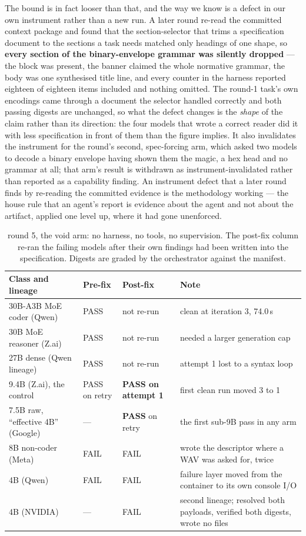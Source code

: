 \documentclass[10pt,twocolumn,letterpaper]{article}
\begin{document}
The bound is in fact looser than that, and the way we know is a defect in our own instrument rather than a new run. A later round re-read the committed context package and found that the section-selector that trims a specification document to the sections a task needs matched only headings of one shape, so \textbf{every section of the binary-envelope grammar was silently dropped} --- the block was present, the banner claimed the whole normative grammar, the body was one synthesised title line, and every counter in the harness reported eighteen of eighteen items included and nothing omitted. The round-1 task's own encodings came through a document the selector handled correctly and both passing digests are unchanged, so what the defect changes is the \emph{shape} of the claim rather than its direction: the four models that wrote a correct reader did it with less specification in front of them than the figure implies. It also invalidates the instrument for the round's second, spec-forcing arm, which asked two models to decode a binary envelope having shown them the magic, a hex head and no grammar at all; that arm's result is withdrawn as instrument-invalidated rather than reported as a capability finding. An instrument defect that a later round finds by re-reading the committed evidence is the methodology working --- the house rule that an agent's report is evidence about the agent and not about the artifact, applied one level up, where it had gone unenforced.

\begin{table}[t]\centering\footnotesize
\caption{round 5, the void arm: no harness, no tools, no supervision. The post-fix column re-ran the failing models after their own findings had been written into the specification. Digests are graded by the orchestrator against the manifest.}
\begin{tabular}{@{}L{2.7cm} l l L{4.4cm}@{}}
\toprule
Class and lineage & Pre-fix & Post-fix & Note \\
\midrule
30B-A3B MoE coder (Qwen) & PASS & not re-run & clean at iteration 3, 74.0\,s \\
30B MoE reasoner (Z.ai) & PASS & not re-run & needed a larger generation cap \\
27B dense (Qwen lineage) & PASS & not re-run & attempt 1 lost to a syntax loop \\
9.4B (Z.ai), the control & PASS on retry & \textbf{PASS on attempt 1} & first clean run moved 3 to 1 \\
7.5B raw, ``effective 4B'' (Google) & --- & \textbf{PASS} on retry & the first sub-9B pass in any arm \\
8B non-coder (Meta) & FAIL & FAIL & wrote the descriptor where a WAV was asked for, twice \\
4B (Qwen) & FAIL & FAIL & failure layer moved from the container to its own console I/O \\
4B (NVIDIA) & --- & FAIL & second lineage; resolved both payloads, verified both digests, wrote no files \\
\bottomrule
\end{tabular}
\end{table}
\end{document}

